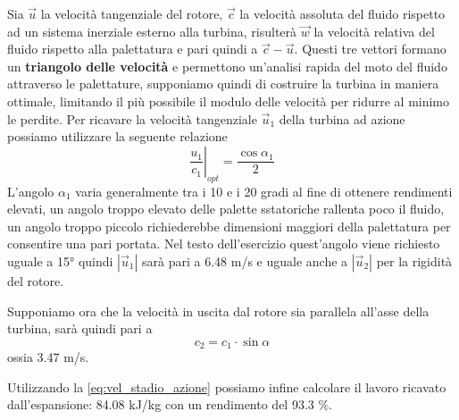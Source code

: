 \documentclass[a4paper,12pt]{article}
\begin{document}
Sia $\vec u$ la velocità tangenziale del rotore, $\vec c$ la velocità assoluta del fluido rispetto ad un sistema inerziale esterno alla turbina,
risulterà $\vec w$ la velocità relativa del fluido rispetto alla palettatura e pari quindi a  $\vec c - \vec u$.
Questi tre vettori formano un \textbf{triangolo delle velocità} e permettono un'analisi rapida del moto del fluido attraverso le palettature,
supponiamo quindi di costruire la turbina in maniera ottimale, limitando il più possibile il modulo delle velocità per ridurre al minimo le perdite.
Per ricavare la velocità tangenziale $\vec u_1$ della turbina ad azione possiamo utilizzare la seguente relazione
\begin{equation}
    \left.\frac{u_1}{c_1}\right|_{opt} = \frac{\cos \alpha_1}{2}
\end{equation}
L'angolo $\alpha_1$ varia generalmente tra i 10 e i 20 gradi al fine di ottenere rendimenti elevati, un angolo troppo elevato delle palette sstatoriche rallenta poco 
il fluido, un angolo troppo piccolo richiederebbe dimensioni maggiori della palettatura per consentire una pari portata.
Nel testo dell'esercizio quest'angolo viene richiesto uguale a 15° quindi $|\vec u_1|$ sarà pari a 6.48 m/s e uguale anche a $|\vec u_2|$ per la rigidità
del rotore.

Supponiamo ora che la velocità in uscita dal rotore sia parallela all'asse della turbina, sarà quindi pari a
\begin{equation}
    c_2 = c_1 \cdot \sin \alpha
\end{equation}
ossia 3.47 m/s.

Utilizzando la \eqref{eq:vel_stadio_azione} possiamo infine calcolare il lavoro ricavato dall'espansione: 84.08 kJ/kg con un rendimento del 93.3 \%.
\end{document}

